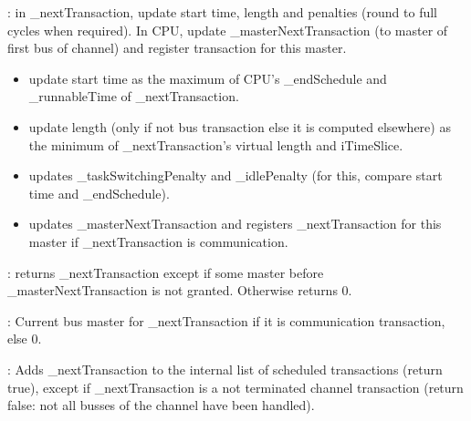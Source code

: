 \documentclass[a4paper,11pt]{article}
\newcommand{\bfont}{\fontseries{b}\selectfont}
\newcommand{\cod}[1]{{\ttfamily #1}}
\newcommand{\method}[1]{\par\vspace{1mm}\hspace{-2mm}\colorbox{method}{\textopenbullet\bfont\cod{#1}:}}
\newcommand{\variable}[1]{\par\vspace{1mm}\hspace{-2mm}\colorbox{variable}{\textopenbullet\bfont\cod{#1}:}}
\begin{document}
\method{calcStartTimeLength(iTimeSlice)} in \cod{\_nextTransaction}, update start time, length and penalties (round to full cycles when required). In CPU, update \cod{\_masterNextTransac\-tion} (to master of first bus of channel) and register transaction for this master. 
\begin{itemize}
\item update start time as the maximum of CPU's \cod{\_endSchedule} and \cod{\_runnableTime} of \cod{\_nextTransaction}.
\item update length (only if not bus transaction else it is computed elsewhere) as the minimum of \cod{\_nextTransaction}'s virtual length and \cod{iTimeSlice}.
\item updates \cod{\_taskSwitchingPenalty} and \cod{\_idlePenalty} (for this, compare start time and \cod{\_endSchedule}).
\item updates \cod{\_masterNextTransaction} and registers \cod{\_nextTransaction} for this master if \cod{\_nextTransaction} is communication. 
\end{itemize}

\method{getNextTransaction} returns \cod{\_nextTransaction} except if some master before \cod{\_mas\-terNextTransaction} is not granted. Otherwise returns 0.

\variable{\_masterNextTransaction} Current bus master for \cod{\_nextTransaction} if it is communication transaction, else 0.

\method{addTransaction} Adds \cod{\_nextTransaction} to the internal list of scheduled transactions (return true), except if \cod{\_nextTransaction} is a not terminated channel transaction (return false: not all busses of the channel have been handled).
\end{document}
